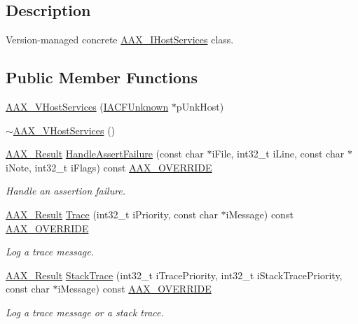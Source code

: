 \subsection{Description}
Version-\/managed concrete \mbox{\hyperlink{a01841}{A\+A\+X\+\_\+\+I\+Host\+Services}} class. \subsection*{Public Member Functions}
\begin{DoxyCompactItemize}
\item 
\mbox{\hyperlink{a01925_aca30ba0a74f2b75fbb82312cd8f1ec8b}{A\+A\+X\+\_\+\+V\+Host\+Services}} (\mbox{\hyperlink{a01409}{I\+A\+C\+F\+Unknown}} $\ast$p\+Unk\+Host)
\item 
\mbox{\hyperlink{a01925_af09ee3e002855a7d9becad700a5b989e}{$\sim$\+A\+A\+X\+\_\+\+V\+Host\+Services}} ()
\item 
\mbox{\hyperlink{a00392_a4d8f69a697df7f70c3a8e9b8ee130d2f}{A\+A\+X\+\_\+\+Result}} \mbox{\hyperlink{a01925_a1954560345e7983d1cf7ccee7af97c22}{Handle\+Assert\+Failure}} (const char $\ast$i\+File, int32\+\_\+t i\+Line, const char $\ast$i\+Note, int32\+\_\+t i\+Flags) const \mbox{\hyperlink{a00392_ac2f24a5172689ae684344abdcce55463}{A\+A\+X\+\_\+\+O\+V\+E\+R\+R\+I\+DE}}
\begin{DoxyCompactList}\small\item\em Handle an assertion failure. \end{DoxyCompactList}\item 
\mbox{\hyperlink{a00392_a4d8f69a697df7f70c3a8e9b8ee130d2f}{A\+A\+X\+\_\+\+Result}} \mbox{\hyperlink{a01925_a242c6853b5f92661b77b774bbccd0e5f}{Trace}} (int32\+\_\+t i\+Priority, const char $\ast$i\+Message) const \mbox{\hyperlink{a00392_ac2f24a5172689ae684344abdcce55463}{A\+A\+X\+\_\+\+O\+V\+E\+R\+R\+I\+DE}}
\begin{DoxyCompactList}\small\item\em Log a trace message. \end{DoxyCompactList}\item 
\mbox{\hyperlink{a00392_a4d8f69a697df7f70c3a8e9b8ee130d2f}{A\+A\+X\+\_\+\+Result}} \mbox{\hyperlink{a01925_a4219edd9b129f3b3182b216cf1062985}{Stack\+Trace}} (int32\+\_\+t i\+Trace\+Priority, int32\+\_\+t i\+Stack\+Trace\+Priority, const char $\ast$i\+Message) const \mbox{\hyperlink{a00392_ac2f24a5172689ae684344abdcce55463}{A\+A\+X\+\_\+\+O\+V\+E\+R\+R\+I\+DE}}
\begin{DoxyCompactList}\small\item\em Log a trace message or a stack trace. \end{DoxyCompactList}\end{DoxyCompactItemize}


